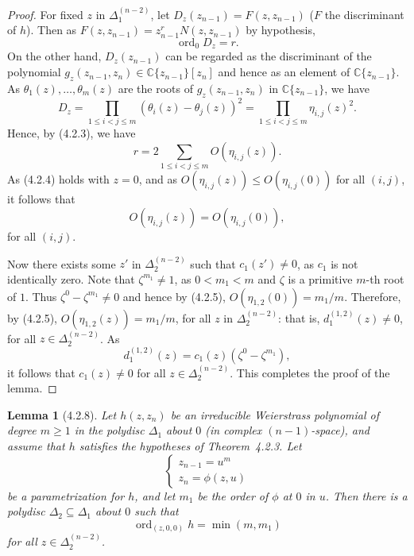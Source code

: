 \documentclass[11pt]{article}
\theoremstyle{plain}
\newtheorem*{lemma*}{Lemma}
\theoremstyle{definition}
\newcommand{\C}{\mathbb{C}}
\DeclareMathOperator{\ord}{ord}
\begin{document}
\begin{proof}
For fixed $z$ in $\Delta_1^{(n-2)}$, let
$D_z(z_{n-1}) = F(z, z_{n-1})$ ($F$ the discriminant of $h$). Then as
$F(z, z_{n-1}) = z_{n-1}^r N(z, z_{n-1})$ by hypothesis,
\begin{equation}
\ord_0 D_z = r. \tag{4.2.3}
\end{equation}
On the other hand, $D_z(z_{n-1})$ can be regarded as the discriminant
of the polynomial $g_z(z_{n-1}, z_n) \in \C\{z_{n-1}\}[z_n]$ and
hence as an element of $\C\{z_{n-1}\}$. As
$\theta_1(z), \ldots, \theta_m(z)$ are the roots of
$g_z(z_{n-1}, z_n)$ in $\C\{z_{n-1}\}$, we have
\[
D_z = \prod_{1 \le i < j \le m} (\theta_i(z) - \theta_j(z))^2
= \prod_{1 \le i < j \le m} \eta_{i, j}(z)^2.
\]
Hence, by (4.2.3), we have
\begin{equation}
r = 2 \sum_{1 \le i < j \le m} O(\eta_{i, j}(z)). \tag{4.2.4}
\end{equation}
As (4.2.4) holds with $z = 0$, and as
$O(\eta_{i, j}(z)) \le O(\eta_{i, j}(0))$ for all $(i, j)$, it
follows that
\begin{equation}
O(\eta_{i, j}(z)) = O(\eta_{i, j}(0)), \tag{4.2.5}
\end{equation}
for all $(i, j)$.

Now there exists some $z'$ in $\Delta_2^{(n-2)}$ such that
$c_1(z') \ne 0$, as $c_1$ is not identically zero. Note that
$\zeta^{m_1} \ne 1$, as $0 < m_1 < m$ and $\zeta$ is a primitive
$m$-th root of $1$. Thus $\zeta^0 - \zeta^{m_1} \ne 0$ and hence by
(4.2.5), $O(\eta_{1, 2}(0)) = m_1/m$. Therefore, by (4.2.5),
$O(\eta_{1, 2}(z)) = m_1/m$, for all $z$ in $\Delta_2^{(n-2)}$: that
is, $d_1^{(1, 2)}(z) \ne 0$, for all $z \in \Delta_2^{(n-2)}$. As
\[
d_1^{(1, 2)}(z) = c_1(z) (\zeta^0 - \zeta^{m_1}),
\]
it follows that $c_1(z) \ne 0$ for all $z \in \Delta_2^{(n-2)}$.
This completes the proof of the lemma.
\end{proof}

\begin{lemma*}[4.2.8]
Let $h(z, z_n)$ be an irreducible Weierstrass polynomial of degree
$m \ge 1$ in the polydisc $\Delta_1$ about $0$ (in complex
$(n-1)$-space), and assume that $h$ satisfies the hypotheses of
Theorem~4.2.3. Let
\[
\begin{cases}
z_{n-1} = u^m \\
z_n = \phi(z, u)
\end{cases}
\]
be a parametrization for $h$, and let $m_1$ be the order of $\phi$
at $0$ in $u$. Then there is a polydisc $\Delta_2 \subseteq \Delta_1$
about $0$ such that
\[
\ord_{(z, 0, 0)} h = \min(m, m_1)
\]
for all $z \in \Delta_2^{(n-2)}$.
\end{lemma*}
\end{document}
